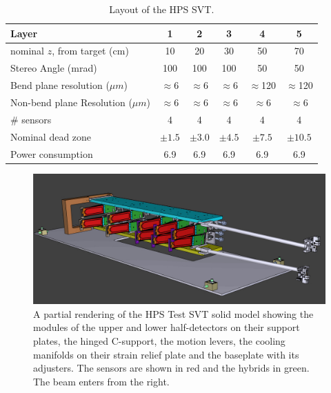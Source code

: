 \begin{table}[h]
\begin{center}
\begin{tabular}{lccccc}   
\hline \hline 
    Layer & 1 & 2 & 3 & 4 & 5 \\      
\hline
    nominal $z$, from target (cm)  & 10 & 20 & 30 & 50 & 70  \\ 
    Stereo Angle (mrad)  & 100 & 100 & 100 & 50 & 50 \\ 
    Bend plane resolution ($\mu m$)  & $\approx$6 & $\approx$6 & $\approx$6 & $\approx$120 & $\approx$120  \\ 
    Non-bend plane Resolution ($\mu m$)  & $\approx$6 & $\approx$6 & $\approx$6 & $\approx$6 & $\approx$6  \\ 
    \# sensors  & 4 & 4 & 4 & 4 & 4  \\ 
    Nominal dead zone  & $\pm1.5$  & $\pm3.0$  & $\pm4.5$  & $\pm7.5$  & $\pm10.5$  \\ 
    Power consumption & 6.9 & 6.9 & 6.9 & 6.9 & 6.9 \\
\hline \hline
\end{tabular}
\caption[]{Layout of the HPS SVT. }
\label{tab:trk} 
\end{center}
\end{table}

\begin{figure}[ht]
    \includegraphics[width=\textwidth]{test2012/HPS_nocables_nowires}
\caption{\small{A partial rendering of the HPS Test SVT solid model showing the modules of the upper and lower half-detectors on their support plates, the hinged C-support, the motion levers, the cooling manifolds on their strain relief plate and the baseplate with its adjusters.  The sensors are shown in red and the hybrids in green. The beam enters from the right.} }
\label{fig:tracker_model}
\end{figure}

